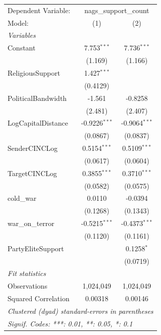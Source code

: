 
\begingroup
\centering
\begin{tabular}{lcc}
   \tabularnewline \midrule \midrule
   Dependent Variable: & \multicolumn{2}{c}{nags\_support\_count}\\
   Model:              & (1)             & (2)\\  
   \midrule
   \emph{Variables}\\
   Constant            & 7.753$^{***}$   & 7.736$^{***}$\\   
                       & (1.169)         & (1.166)\\   
   ReligiousSupport    & 1.427$^{***}$   &   \\   
                       & (0.4129)        &   \\   
   PoliticalBandwidth  & -1.561          & -0.8258\\   
                       & (2.481)         & (2.407)\\   
   LogCapitalDistance  & -0.9226$^{***}$ & -0.9064$^{***}$\\   
                       & (0.0867)        & (0.0837)\\   
   SenderCINCLog       & 0.5154$^{***}$  & 0.5109$^{***}$\\   
                       & (0.0617)        & (0.0604)\\   
   TargetCINCLog       & 0.3855$^{***}$  & 0.3710$^{***}$\\   
                       & (0.0582)        & (0.0575)\\   
   cold\_war           & 0.0110          & -0.0394\\   
                       & (0.1268)        & (0.1343)\\   
   war\_on\_terror     & -0.5215$^{***}$ & -0.4373$^{***}$\\   
                       & (0.1120)        & (0.1161)\\   
   PartyEliteSupport   &                 & 0.1258$^{*}$\\   
                       &                 & (0.0719)\\   
   \midrule
   \emph{Fit statistics}\\
   Observations        & 1,024,049       & 1,024,049\\  
   Squared Correlation & 0.00318         & 0.00146\\  
   \midrule \midrule
   \multicolumn{3}{l}{\emph{Clustered (dyad) standard-errors in parentheses}}\\
   \multicolumn{3}{l}{\emph{Signif. Codes: ***: 0.01, **: 0.05, *: 0.1}}\\
\end{tabular}
\par\endgroup


